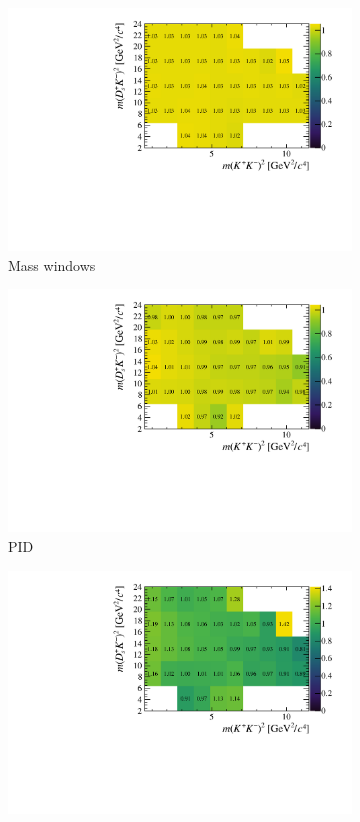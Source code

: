 \begin{figure}[!h]
\begin{subfigure}[t]{0.4\textwidth}
      \includegraphics[width=1.0\textwidth]{figs/B2DsKK/Relative_Eff_mass_All.pdf}
      \caption{Mass windows}
   \end{subfigure}
   \begin{subfigure}[t]{0.4\textwidth}
      \includegraphics[width=1.0\textwidth]{figs/B2DsKK/Relative_Eff_PID_All.pdf}
      \caption{PID}
   \end{subfigure}
   \begin{subfigure}[t]{0.4\textwidth}
      \includegraphics[width=1.0\textwidth]{figs/B2DsKK/Relative_Eff_BDT_All.pdf}

\end{subfigure}
\end{figure}
